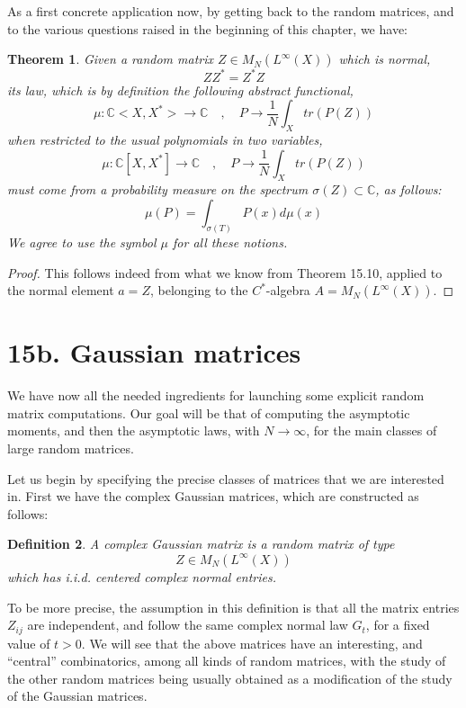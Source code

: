 \documentclass[12pt]{amsbook}
\newtheorem{theorem}{Theorem}[chapter]
\newtheorem{definition}[theorem]{Definition}
\begin{document}
As a first concrete application now, by getting back to the random matrices, and to the various questions raised in the beginning of this chapter, we have:

\begin{theorem}
Given a random matrix $Z\in M_N(L^\infty(X))$ which is normal, 
$$ZZ^*=Z^*Z$$
its law, which is by definition the following abstract functional,
$$\mu:\mathbb C<X,X^*>\to\mathbb C\quad,\quad 
P\to\frac{1}{N}\int_Xtr(P(Z))$$
when restricted to the usual polynomials in two variables,
$$\mu:\mathbb C[X,X^*]\to\mathbb C\quad,\quad 
P\to\frac{1}{N}\int_Xtr(P(Z))$$
must come from a probability measure on the spectrum $\sigma(Z)\subset\mathbb C$, as follows:
$$\mu(P)=\int_{\sigma(T)}P(x)d\mu(x)$$
We agree to use the symbol $\mu$ for all these notions.
\end{theorem}

\begin{proof}
This follows indeed from what we know from Theorem 15.10, applied to the normal element $a=Z$, belonging to the $C^*$-algebra $A=M_N(L^\infty(X))$. 
\end{proof}

\section*{15b. Gaussian matrices}

We have now all the needed ingredients for launching some explicit random matrix computations. Our goal will be that of computing the asymptotic moments, and then the asymptotic laws, with $N\to\infty$, for the main classes of large random matrices. 

\bigskip

Let us begin by specifying the precise classes of matrices that we are interested in. First we have the complex Gaussian matrices, which are constructed as follows:


\begin{definition}
A complex Gaussian matrix is a random matrix of type
$$Z\in M_N(L^\infty(X))$$
which has i.i.d. centered complex normal entries.
\end{definition}

To be more precise, the assumption in this definition is that all the matrix entries $Z_{ij}$ are independent, and follow the same complex normal law $G_t$, for a fixed value of $t>0$. We will see that the above matrices have an interesting, and ``central'' combinatorics, among all kinds of random matrices, with the study of the other random matrices being usually obtained as a modification of the study of the Gaussian matrices.
\end{document}
